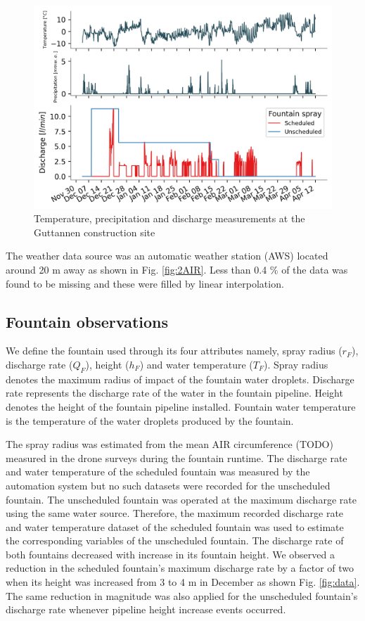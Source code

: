 \documentclass[tc, manuscript]{copernicus}
\begin{document}
\begin{figure}[t]
\includegraphics[width=12cm]{Figures/data.png}
\caption{Temperature, precipitation and discharge measurements at the Guttannen construction site}
\label{fig:aws} 
\end{figure}

The weather data source was an automatic weather station (AWS) located around 20 m away as shown in Fig.
\ref{fig:2AIR}. Less than 0.4 \% of the data was found to be missing and these were filled by linear
interpolation. 

\subsection{Fountain observations}

We define the fountain used through its four attributes namely, spray radius ($r_F$), discharge rate ($Q_F$),
height ($h_F$) and water temperature ($T_F$). Spray radius denotes the maximum radius of impact of the fountain
water droplets. Discharge rate represents the discharge rate of the water in the fountain pipeline. Height
denotes the height of the fountain pipeline installed. Fountain water temperature is the temperature of the
water droplets produced by the fountain.

The spray radius was estimated from the mean AIR circumference (TODO) measured in the drone surveys during the fountain
runtime. The discharge rate and water temperature of the scheduled fountain was measured by the automation
system but no such datasets were recorded for the unscheduled fountain. The unscheduled fountain was operated at
the maximum discharge rate using the same water source. Therefore, the maximum recorded discharge rate and water
temperature dataset of the scheduled fountain was used to estimate the corresponding variables of the
unscheduled fountain. The discharge rate of both fountains decreased with increase in its fountain height. We
observed a reduction in the scheduled fountain's maximum discharge rate by a factor of two when its height was
increased from 3 to 4 m in December as shown Fig. \ref{fig:data}. The same reduction in magnitude was also
applied for the unscheduled fountain's discharge rate whenever pipeline height increase events occurred. 
\end{document}
